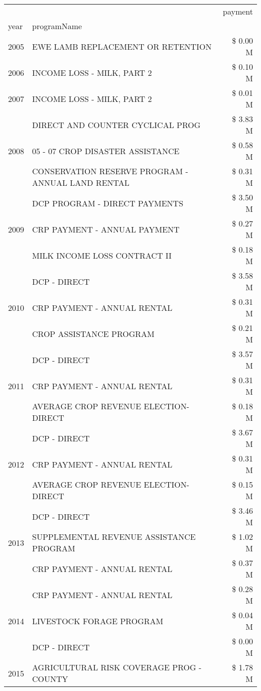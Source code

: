 \begin{tabular}{llr}
\toprule
 &  & payment \\
year & programName &  \\
\midrule
2005 & EWE LAMB REPLACEMENT OR RETENTION & \$ 0.00 M \\
\cline{1-3}
2006 & INCOME LOSS - MILK, PART 2 & \$ 0.10 M \\
\cline{1-3}
2007 & INCOME LOSS - MILK, PART 2 & \$ 0.01 M \\
\cline{1-3}
\multirow[t]{3}{*}{2008} & DIRECT AND COUNTER CYCLICAL PROG & \$ 3.83 M \\
 & 05 - 07 CROP DISASTER ASSISTANCE & \$ 0.58 M \\
 & CONSERVATION RESERVE PROGRAM - ANNUAL LAND RENTAL & \$ 0.31 M \\
\cline{1-3}
\multirow[t]{3}{*}{2009} & DCP PROGRAM - DIRECT PAYMENTS & \$ 3.50 M \\
 & CRP PAYMENT - ANNUAL PAYMENT & \$ 0.27 M \\
 & MILK INCOME LOSS CONTRACT II & \$ 0.18 M \\
\cline{1-3}
\multirow[t]{3}{*}{2010} & DCP - DIRECT & \$ 3.58 M \\
 & CRP PAYMENT - ANNUAL RENTAL & \$ 0.31 M \\
 & CROP ASSISTANCE PROGRAM & \$ 0.21 M \\
\cline{1-3}
\multirow[t]{3}{*}{2011} & DCP - DIRECT & \$ 3.57 M \\
 & CRP PAYMENT - ANNUAL RENTAL & \$ 0.31 M \\
 & AVERAGE CROP REVENUE ELECTION-DIRECT & \$ 0.18 M \\
\cline{1-3}
\multirow[t]{3}{*}{2012} & DCP - DIRECT & \$ 3.67 M \\
 & CRP PAYMENT - ANNUAL RENTAL & \$ 0.31 M \\
 & AVERAGE CROP REVENUE ELECTION-DIRECT & \$ 0.15 M \\
\cline{1-3}
\multirow[t]{3}{*}{2013} & DCP - DIRECT & \$ 3.46 M \\
 & SUPPLEMENTAL REVENUE ASSISTANCE PROGRAM & \$ 1.02 M \\
 & CRP PAYMENT - ANNUAL RENTAL & \$ 0.37 M \\
\cline{1-3}
\multirow[t]{3}{*}{2014} & CRP PAYMENT - ANNUAL RENTAL & \$ 0.28 M \\
 & LIVESTOCK FORAGE PROGRAM & \$ 0.04 M \\
 & DCP - DIRECT & \$ 0.00 M \\
\cline{1-3}
\multirow[t]{3}{*}{2015} & AGRICULTURAL RISK COVERAGE PROG - COUNTY & \$ 1.78 M \\

\end{tabular}
